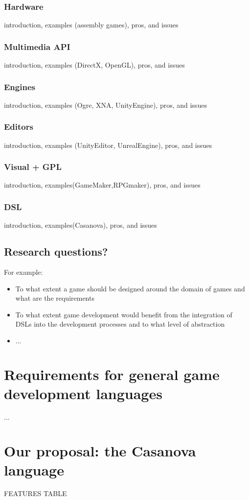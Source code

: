 \documentclass[10pt,a4paper]{book}
\begin{document}
\newpage
\subsection{Hardware} introduction, examples (assembly games), pros, and issues
\subsection{Multimedia API} introduction, examples (DirectX, OpenGL), pros, and issues
\subsection{Engines} introduction, examples (Ogre, XNA, UnityEngine), pros, and issues
\subsection{Editors} introduction, examples (UnityEditor, UnrealEngine), pros, and issues
\subsection{Visual + GPL} introduction, examples(GameMaker,RPGmaker), pros, and issues
\subsection{DSL} introduction, examples(Casanova), pros, and issues

\section{Research questions?}
For example: 
\begin{itemize}
\item To what extent a game should be designed around the domain of games and what are the requirements
\item To what extent game development would benefit from the integration of DSLs into the development processes and to what level of abstraction
\item ...
\end{itemize}

\chapter{Requirements for general game development languages}
...

\chapter{Our proposal: the Casanova language}
FEATURES TABLE
\end{document}
